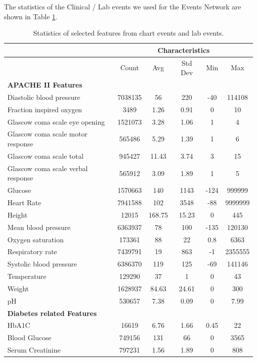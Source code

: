 \documentclass{sigkddExp}
\begin{document}
The statistics of the Clinical / Lab events we used for the Events Network are shown in Table \ref{tab:events-stats}.

\begin{table}
       \centering
       \caption{Statistics of selected features from chart events and lab events.}
       \label{tab:events-stats}
       \begin{tabular}{|l|c|c|c|c|c|} \hline
        & \multicolumn {5}{|c|}{Characteristics} \\ \hline
       &Count&Avg&Std Dev&Min&Max \\ \hline       
       \multicolumn{6}{|l|}{\textbf{APACHE II Features}} \\ \hline
       Diastolic blood pressure&7038135&56&220&-40&114108\\ \hline
       Fraction inspired oxygen&3489&1.26&0.91&0&10\\ \hline
       Glascow coma scale eye opening&1521073&3.28&1.06&1&4\\ \hline
       Glascow coma scale motor response&565486&5.29&1.39&1&6\\ \hline
       Glascow coma scale total&945427&11.43&3.74&3&15\\ \hline
       Glascow coma scale verbal response&565912&3.09&1.89&1&5\\ \hline
       Glucose&1570663&140&1143&-124&999999\\ \hline
       Heart Rate&7941588&102&3548&-88&9999999\\ \hline
       Height&12015&168.75&15.23&0&445\\ \hline
       Mean blood pressure&6363937&78&100&-135&120130\\ \hline
       Oxygen saturation&173361&88&22&0.8&6363\\ \hline
       Respiratory rate&7439791&19&863&-1&2355555\\ \hline
       Systolic blood pressure&6386370&119&125&-69&141146\\ \hline
       Temperature&129290&37&1&0&43\\ \hline
       Weight&1628937&84.63&24.61&0&300\\ \hline
       pH&530657&7.38&0.09&0&7.99\\ \hline
       \multicolumn{6}{|l|}{\textbf{Diabetes related Features}}\\ \hline
       HbA1C&16619&6.76&1.66&0.45&22\\ \hline
       Blood Glucose&749156&131&66&0&3565\\ \hline
       Serum Creatinine&797231&1.56&1.89&0&808\\ \hline
       \end{tabular}
\end{table}
\end{document}
